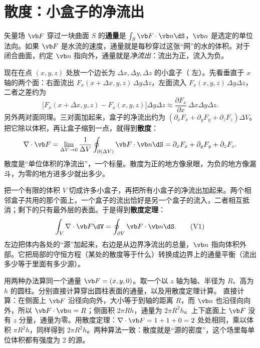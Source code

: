 \section{散度：小盒子的净流出}\label{sec:calc-div}

矢量场 $\vb F$ 穿过一块曲面 $S$ 的\textbf{通量}是 $\int_S\vb F\cdot\vb n\dS$，$\vb n$ 是选定的单位法向。如果 $\vb F$ 是水流的速度，通量就是每秒穿过这张“网”的水的体积。对于闭合曲面，约定 $\vb n$ 指向外，通量就是\emph{净流出}：流出为正，流入为负。


现在在点 $(x,y,z)$ 处放一个边长为 $\Delta x,\Delta y,\Delta z$ 的小盒子（ 左）。先看垂直于 $x$ 轴的两个面：右面流出 $F_x(x+\Delta x,y,z)\,\Delta y\Delta z$，左面流入 $F_x(x,y,z)\,\Delta y\Delta z$，二者之差约为
\begin{equation*}
\bigl[F_x(x+\Delta x,y,z)-F_x(x,y,z)\bigr]\Delta y\Delta z\approx\frac{\partial F_x}{\partial x}\,\Delta x\Delta y\Delta z .
\end{equation*}
另外两对面同理。三对面加起来，盒子的净流出约为 $(\partial_xF_x+\partial_yF_y+\partial_zF_z)\Delta V$。把它除以体积，再让盒子缩到一点，就得到\textbf{散度}：
\begin{equation}
\nabla\cdot\vb F=\lim_{\Delta V\to0}\frac{1}{\Delta V}\oint_{\partial(\Delta V)}\vb F\cdot\vb n\dS
=\partial_xF_x+\partial_yF_y+\partial_zF_z .
\label{eq:calc-divdef}
\end{equation}
散度是“单位体积的净流出”，一个标量。散度为正的地方像泉眼，为负的地方像漏斗，为零的地方进多少就出多少。

把一个有限的体积 $V$ 切成许多小盒子，再把所有小盒子的净流出加起来。两个相邻盒子共用的那个面上，一个盒子的流出恰好是另一个盒子的流入，二者相互抵消；剩下的只有最外层的表面。于是得到\textbf{散度定理}：
\begin{equation}
\int_V\nabla\cdot\vb F\dV=\oint_{\partial V}\vb F\cdot\vb n\dS.
\tag{V1}\label{id:div}
\end{equation}
左边把体内各处的“源”加起来，右边是从边界净流出的总量，$\vb n$ 指向体积外部。它把局部的守恒方程（某处的散度等于什么）转换成边界上的通量平衡（流出多少等于里面有多少源）。

\begin{example}[unbreakable]{用两种办法算同一个通量}\label{ex:calc-cylinder}
$\vb F=(x,y,0)$。取一个以 $z$ 轴为轴、半径为 $R$、高为 $h$ 的圆柱。分别直接计算穿出圆柱表面的通量，以及用散度定理计算。
\solution
直接计算：在侧面上 $\vb F$ 沿径向向外，大小等于到轴的距离 $R$，而 $\vb n$ 也沿径向向外，所以 $\vb F\cdot\vb n=R$；侧面积 $2\pi Rh$，通量为 $2\pi R^2h$。上下底面上 $\vb F$ 没有 $z$ 分量，通量为零。用散度定理：$\nabla\cdot\vb F=1+1+0=2$ 处处相同，乘以体积 $\pi R^2h$，同样得到 $2\pi R^2h$。两种算法一致：散度就是“源的密度”，这个场里每单位体积都有强度为 2 的源。
\end{example}

